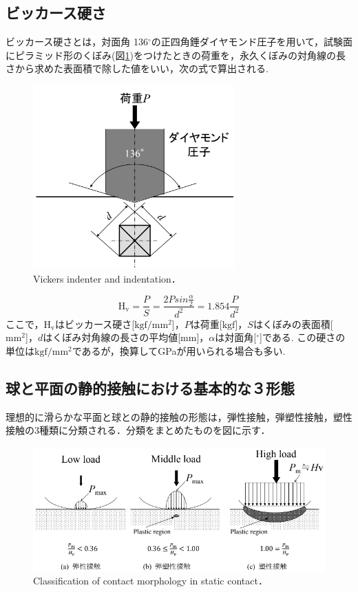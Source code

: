 \subsection{ビッカース硬さ}
ビッカース硬さとは，対面角 136$^\circ$の正四角錘ダイヤモンド圧子を用いて，試験面にピラミッド形のくぼみ(図\ref{fig:ビッカース硬さ})をつけたときの荷重を，永久くぼみの対角線の長さから求めた表面積で除した値をいい，次の式で算出される.
\begin{figure}[htbp]
    \centering %
    \includegraphics[width=100truemm,clip]{fig/fig_ビッカース硬さ.png}
    \caption{Vickers indenter and indentation．}
    \label{fig:ビッカース硬さ}
\end{figure}
\begin{equation}
    \label{eq:ビッカース硬さ}
    \mathrm{H_v} = \frac{P}{S} = \frac{2Psin \frac{\alpha}{2}}{d^2} = 1.854\frac{P}{d^2}
\end{equation}
ここで，$\mathrm{H_v}$はビッカース硬さ[$\mathrm{kgf/mm^2}$]，$P$は荷重[$\mathrm{kgf}$]，$S$はくぼみの表面積[$\mathrm{mm^2}$]，$d$はくぼみ対角線の長さの平均値[mm]，$\alpha$は対面角[$^\circ$]である. この硬さの単位は$\mathrm{kgf/mm^2}$であるが，換算してGPaが用いられる場合も多い.

\subsection{球と平面の静的接触における基本的な３形態}
理想的に滑らかな平面と球との静的接触の形態は，弾性接触，弾塑性接触，塑性接触の3種類に分類される．分類をまとめたものを図に示す．

\begin{figure}[htbp]
    \centering %
    \includegraphics[width=100truemm,clip]{fig/fig_接触形態の分類.png}
    \caption{Classification of contact morphology in static contact．}
    \label{fig:接触形態}
\end{figure}